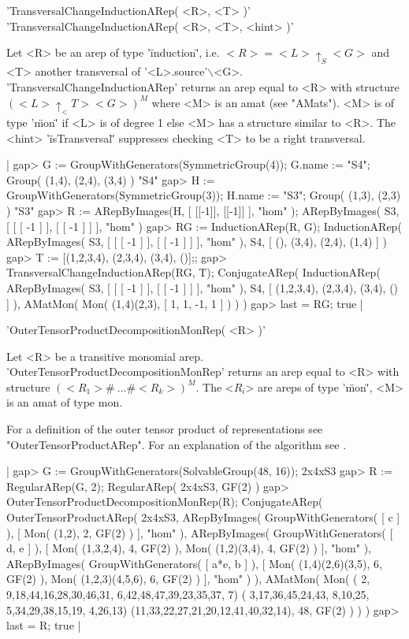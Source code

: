'TransversalChangeInductionARep( <R>, <T> )'\\
'TransversalChangeInductionARep( <R>, <T>, <hint> )'

Let <R> be an arep of type '\"induction\"', i.e. 
$<R> = <L>\uparrow_S <G>$ and <T> another transversal of 
'<L>.source'$\backslash$<G>. 
'TransversalChangeInductionARep' returns an arep equal to <R>
with structure $(<L>\uparrow_<T> <G>)^M$
where <M> is an amat (see "AMats"). <M> is of type '\"mon\"'
if <L> is of degree 1 else <M> has a structure similar to <R>.
The <hint> '\"isTransversal\"' suppresses checking <T> to be a 
right transversal.

|    gap> G := GroupWithGenerators(SymmetricGroup(4)); G.name := "S4";
    Group( (1,4), (2,4), (3,4) )
    "S4"
    gap> H := GroupWithGenerators(SymmetricGroup(3)); H.name := "S3";
    Group( (1,3), (2,3) )
    "S3"
    gap> R := ARepByImages(H, [ [[-1]], [[-1]] ], "hom" );
    ARepByImages(
      S3,
      [ [ [ -1 ] ], [ [ -1 ] ] ],
      "hom"
    )
    gap> RG := InductionARep(R, G);
    InductionARep(
      ARepByImages(
        S3,
        [ [ [ -1 ] ], [ [ -1 ] ] ],
        "hom"
      ),
      S4,
      [ (), (3,4), (2,4), (1,4) ]
    )
    gap> T := [(1,2,3,4), (2,3,4), (3,4), ()];;
    gap> TransversalChangeInductionARep(RG, T);     
    ConjugateARep(
      InductionARep(
        ARepByImages(
          S3,
          [ [ [ -1 ] ], [ [ -1 ] ] ],
          "hom"
        ),
        S4,
        [ (1,2,3,4), (2,3,4), (3,4), () ]
      ),
      AMatMon( Mon( (1,4)(2,3), [ 1, 1, -1, 1 ] ) )
    )
    gap> last = RG;
    true |


'OuterTensorProductDecompositionMonRep( <R> )'

Let <R> be a transitive monomial arep. 
'OuterTensorProductDecompositionMonRep' returns an arep 
equal to <R> with structure $(<R_1>\#\ \dots\#<R_k>)^M.$
The <$R_i$> are areps 
of type '\"mon\"', <M> is an amat of type mon.

For a definition of the outer tensor product of representations
see "OuterTensorProductARep".
For an explanation of the algorithm see \cite{Pue98}.

|    gap> G := GroupWithGenerators(SolvableGroup(48, 16));
    2x4xS3
    gap> R := RegularARep(G, 2);
    RegularARep( 2x4xS3, GF(2) )
    gap> OuterTensorProductDecompositionMonRep(R);
    ConjugateARep(
      OuterTensorProductARep(
        2x4xS3,
        ARepByImages(
          GroupWithGenerators( [ c ] ),
          [ Mon( (1,2), 2, GF(2) ) ],
          "hom"
        ),
        ARepByImages(
          GroupWithGenerators( [ d, e ] ),
          [ Mon( (1,3,2,4), 4, GF(2) ),
            Mon( (1,2)(3,4), 4, GF(2) )
          ],
          "hom"
        ),
        ARepByImages(
          GroupWithGenerators( [ a*e, b ] ),
          [ Mon( (1,4)(2,6)(3,5), 6, GF(2) ),
            Mon( (1,2,3)(4,5,6), 6, GF(2) )
          ],
          "hom"
        )
      ),
      AMatMon( Mon( ( 2, 9,18,44,16,28,30,46,31, 6,42,48,47,39,23,35,37, 7)
    ( 3,17,36,45,24,43, 8,10,25, 5,34,29,38,15,19, 4,26,13)
    (11,33,22,27,21,20,12,41,40,32,14), 48, GF(2) ) )
    )
    gap> last = R;
    true |

